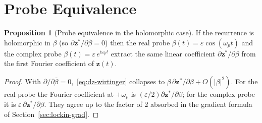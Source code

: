 \documentclass[11pt]{article}
\newcommand{\im}{\mathrm{i}}
\theoremstyle{definition}
\newtheorem{proposition}{Proposition}
\begin{document}
\section{Probe Equivalence}\label{app:probe-equiv}

\begin{proposition}[Probe equivalence in the holomorphic case]
\label{prop:holo-equiv}
If the recurrence is holomorphic in $\beta$ (so
$\partial\bm{z}^*/\partial\bar\beta = 0$) then the real probe
$\beta(t) = \varepsilon\cos(\omega_p t)$ and the complex probe
$\beta(t) = \varepsilon\,e^{\im\omega_p t}$ extract the same linear
coefficient $\partial\bm{z}^*/\partial\beta$ from the first
Fourier coefficient of $\bm{z}(t)$.
\end{proposition}
\begin{proof}
With $\partial/\partial\bar\beta = 0$,~\eqref{eq:dz-wirtinger}
collapses to $\beta\,\partial\bm{z}^*/\partial\beta + O(|\beta|^2)$.
For the real probe the Fourier coefficient at $+\omega_p$ is
$(\varepsilon/2)\partial\bm{z}^*/\partial\beta$; for the complex probe
it is $\varepsilon\,\partial\bm{z}^*/\partial\beta$.  They agree up
to the factor of 2 absorbed in the gradient formula
of Section~\ref{sec:lockin-grad}.
\end{proof}
\end{document}
